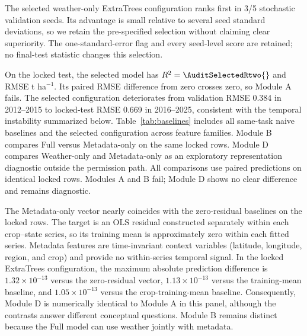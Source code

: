 \documentclass[conference]{IEEEtran}
\begin{document}
The selected weather-only ExtraTrees configuration ranks first in 3/5 stochastic
validation seeds. Its advantage is small relative to several seed standard
deviations, so we retain the pre-specified selection without claiming clear
superiority. The one-standard-error flag and every seed-level
score are retained; no final-test statistic changes this selection.

On the locked test, the selected model has $R^2=\AuditSelectedRtwo{}$ and RMSE
\AuditSelectedRMSE{} t ha$^{-1}$. Its paired RMSE difference from zero crosses
zero, so Module A fails. The selected configuration deteriorates from validation
RMSE 0.384 in 2012--2015 to locked-test RMSE 0.669 in 2016--2025, consistent with
the temporal instability summarized below. Table~\ref{tab:baselines} includes all
same-task naive baselines and the selected configuration across feature families.
Module B compares Full versus Metadata-only on the same locked rows. Module D
compares Weather-only and Metadata-only as an exploratory representation
diagnostic outside the permission path. All comparisons use paired predictions on
identical locked rows. Modules A and B fail; Module D shows no clear difference
and remains diagnostic.

The Metadata-only vector nearly coincides with the zero-residual baselines on the
locked rows. The target is an OLS residual constructed separately within each
crop--state series, so its training mean is approximately zero within each fitted
series. Metadata features are time-invariant context variables (latitude,
longitude, region, and crop) and provide no within-series temporal signal. In the
locked ExtraTrees configuration, the maximum absolute prediction difference is
$1.32\times10^{-13}$ versus the zero-residual vector, $1.13\times10^{-13}$ versus
the training-mean baseline, and $1.05\times10^{-13}$ versus the crop-training-mean
baseline. Consequently, Module D is numerically identical to Module A in this panel,
although the contrasts answer different conceptual questions. Module B remains
distinct because the Full model can use weather jointly with metadata.

\begin{table}[t]
\centering
\caption{Locked 2016--2025 same-task audit. Learned-model predictions are seed
aggregated. $\Delta$RMSE is model minus zero-residual RMSE with paired 95\%
year-block intervals; RMSE is t ha$^{-1}$.}
\label{tab:baselines}
\scriptsize
\resizebox{\textwidth}{!}{}
\end{table}
\end{document}
